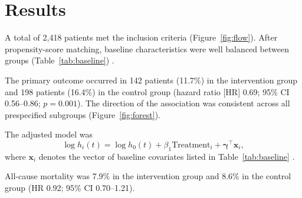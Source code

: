 \section{Results}
\label{sec:results}

A total of 2,418 patients met the inclusion criteria (Figure~\ref{fig:flow}). After propensity-score matching, baseline characteristics were well balanced between groups (Table~\ref{tab:baseline}) \cite{austin2011introduction}.

The primary outcome occurred in 142 patients (11.7\%) in the intervention group and 198 patients (16.4\%) in the control group (hazard ratio [HR] 0.69; 95\% CI 0.56--0.86; $p = 0.001$). The direction of the association was consistent across all prespecified subgroups (Figure~\ref{fig:forest}).

The adjusted model was
\begin{equation}
  \log h_i(t) = \log h_0(t) + \beta_1 \text{Treatment}_i + \boldsymbol{\gamma}^\top \mathbf{x}_i ,
  \label{eq:cox}
\end{equation}
where $\mathbf{x}_i$ denotes the vector of baseline covariates listed in Table~\ref{tab:baseline} \cite{cox1972regression, therneau2000modeling}.

All-cause mortality was 7.9\% in the intervention group and 8.6\% in the control group (HR 0.92; 95\% CI 0.70--1.21).
